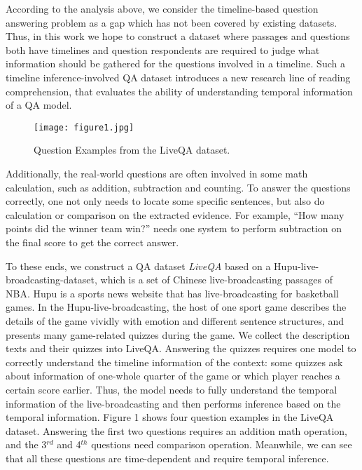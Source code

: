 According to the analysis above, we consider the timeline-based question answering problem as a gap  which has not been covered by existing datasets.
Thus, in this work we hope to construct a dataset where passages and questions both have timelines and question respondents are required to judge what information should be gathered for the questions involved in a timeline.
Such a timeline inference-involved QA dataset introduces a new research line of reading comprehension, that evaluates the ability of understanding temporal information of a QA model.
\begin{figure}[!t]                                                     %
\centering                                                                %
\texttt{[image: figure1.jpg]}                                    %
\caption{Question Examples from the LiveQA dataset.}                                    %
\end{figure}

Additionally, the real-world questions are often involved in some math calculation, such as addition, subtraction and counting.
To answer the questions correctly, one not only needs to  locate  some specific sentences, but also do calculation or comparison on the extracted evidence. For example, ``How many points did the winner team win?'' needs one system to perform subtraction on the final score to get the correct answer.

To these ends, we construct a QA dataset \textit{LiveQA} based on a Hupu-live-broadcasting-dataset, which is a set of Chinese live-broadcasting passages of NBA. Hupu is a sports news website that has live-broadcasting for basketball games.
In the Hupu-live-broadcasting, the host of one sport game describes the details of the game vividly with emotion and different sentence structures, and presents many game-related quizzes during the game.
We collect the description texts and their quizzes into  LiveQA.
Answering the quizzes requires one model to correctly understand the timeline information of the context: some quizzes ask about information of one-whole quarter of the game or which player reaches a certain score earlier. Thus, the model needs to fully understand the temporal information of the live-broadcasting and then performs inference based on the temporal information. 
Figure 1 shows four question examples in the LiveQA dataset. Answering the first two questions requires an addition math operation, and the 3$^{rd}$ and 4$^{th}$ questions need comparison operation. Meanwhile, we can see that all these questions are time-dependent and require temporal inference.

